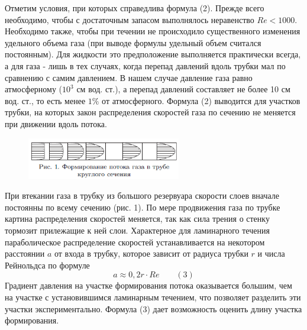 \documentclass[a4paper, 12pt]{article}%
\begin{document}
Отметим условия, при которых справедлива формула (2). Прежде всего необходимо, чтобы с достаточным запасом выполнялось неравенство $Re < 1000$. Необходимо также, чтобы при течении не происходило существенного изменения удельного объема газа (при выводе формулы удельный объем считался постоянным). Для жидкости это предположение выполняется практически всегда, а для газа - лишь в тех случаях, когда перепад давлений вдоль трубки мал по сравнению с самим давлением. В нашем случае давление газа равно атмосферному ($10^3$ см вод. ст.), а перепад давлений составляет не более 10 см вод. ст., то есть менее $1\%$ от атмосферного. Формула (2) выводится для участков трубки, на которых закон распределения скоростей газа по сечению не меняется при движении вдоль потока.
\begin{figure}
  \begin{center}
    \includegraphics[width = 0.6\textwidth]{133_1.png}
  \end{center}
\end{figure}
При втекании газа в трубку из большого резервуара скорости слоев вначале постоянны по всему сечению (рис. 1). По мере продвижения газа по трубке картина распределения скоростей меняется, так как сила трения о стенку тормозит прилежащие к ней слои. Характерное для ламинарного течения параболическое распределение скоростей устанавливается на некотором расстоянии $a$ от входа в трубку, которое зависит от радиуса трубки $r$ и числа Рейнольдса по формуле
\[a \approx  0,2 r \cdot Re \text{ } \text{ } \text{ } (3)\]
Градиент давления на участке формирования потока оказывается большим, чем на участке с установившимся ламинарным течением, что позволяет разделить эти участки экспериментально. Формула (3) дает возможность оценить длину участка формирования.
\end{document}

